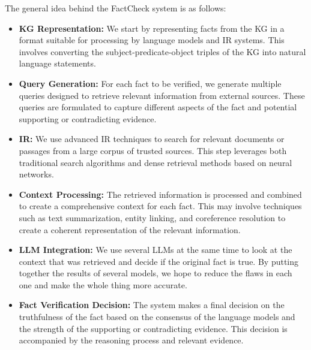 The general idea behind the FactCheck system is as follows:
\begin{itemize}
    \item \textbf{\ac{KG} Representation:} We start by representing facts from the \ac{KG} in a format suitable for processing by language models and \ac{IR} systems. This involves converting the subject-predicate-object triples of the \ac{KG} into natural language statements.
    \item \textbf{Query Generation:} For each fact to be verified, we generate multiple queries designed to retrieve relevant information from external sources. These queries are formulated to capture different aspects of the fact and potential supporting or contradicting evidence.
    \item \textbf{\ac{IR}:} We use advanced \ac{IR} techniques to search for relevant documents or passages from a large corpus of trusted sources. This step leverages both traditional search algorithms and dense retrieval methods based on neural networks.
    \item \textbf{Context Processing:} The retrieved information is processed and combined to create a comprehensive context for each fact. This may involve techniques such as text summarization, entity linking, and coreference resolution to create a coherent representation of the relevant information.
    \item \textbf{\ac{LLM} Integration:} We use several \ac{LLMs} at the same time to look at the context that was retrieved and decide if the original fact is true. By putting together the results of several models, we hope to reduce the flaws in each one and make the whole thing more accurate.
    \item \textbf{Fact Verification Decision:} The system makes a final decision on the truthfulness of the fact based on the consensus of the language models and the strength of the supporting or contradicting evidence. This decision is accompanied by the reasoning process and relevant evidence.
\end{itemize}

